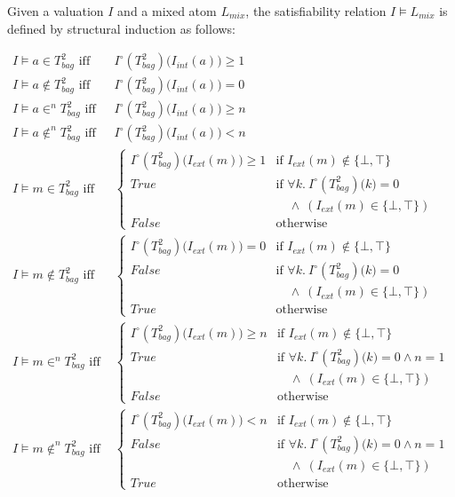 Given a valuation $I$ and a mixed atom $L_{mix}$, the satisfiability relation $I \models L_{mix}$ is defined by structural induction as follows:
\begin{small}
\begin{align*}
I \models a\in T^2_{bag} \mbox{ iff }& I^\circ(T^2_{bag})\big(I_{int}(a)\big) \ge 1 \\
I \models a\notin T^2_{bag} \mbox{ iff }& I^\circ(T^2_{bag})\big(I_{int}(a)\big) = 0 \\
I \models a\in^{n} T^2_{bag} \mbox{ iff }& I^\circ(T^2_{bag})\big(I_{int}(a)\big) \ge n \\
I \models a\notin^{n} T^2_{bag} \mbox{ iff }& I^\circ(T^2_{bag})\big(I_{int}(a)\big) < n \\
I \models m\in T^2_{bag} \mbox{ iff }& \left\{\begin{array}{ll}
I^\circ(T^2_{bag})\big(I_{ext}(m)\big) \ge 1 & \mbox{if } I_{ext}(m)\not\in\{\bot ,\top\} \\
True & \mbox{if } \forall k.~I^\circ(T^2_{bag})\big(k) = 0 \\
     &\quad \land\ (I_{ext}(m) \in \{\bot,\top\})\\
False & \mbox{otherwise}
\end{array}\right.\\
I \models m\notin T^2_{bag} \mbox{ iff }& \left\{\begin{array}{ll}
I^\circ(T^2_{bag})\big(I_{ext}(m)\big) = 0 & \mbox{if } I_{ext}(m)\not\in\{\bot ,\top\} \\
False & \mbox{if } \forall k.~I^\circ(T^2_{bag})\big(k) = 0 \\
     &\quad \land\ (I_{ext}(m) \in \{\bot,\top\})\\
True & \mbox{otherwise}
\end{array}\right.\\
I \models m\in^{n} T^2_{bag} \mbox{ iff }& \left\{\begin{array}{ll}
I^\circ(T^2_{bag})\big(I_{ext}(m)\big) \ge n & \mbox{if } I_{ext}(m)\not\in\{\bot ,\top\} \\
True & \mbox{if } \forall k.~I^\circ(T^2_{bag})\big(k) = 0  \land n = 1\\
     &\quad \land\ (I_{ext}(m) \in \{\bot,\top\})\\
False & \mbox{otherwise}
\end{array}\right.\\
I \models m\notin^{n} T^2_{bag} \mbox{ iff }& \left\{\begin{array}{ll}
I^\circ(T^2_{bag})\big(I_{ext}(m)\big) < n & \mbox{if } I_{ext}(m)\not\in\{\bot ,\top\} \\
False & \mbox{if } \forall k.~I^\circ(T^2_{bag})\big(k) = 0 \land n = 1\\
     &\quad \land\ (I_{ext}(m) \in \{\bot,\top\})\\
True & \mbox{otherwise}
\end{array}\right.
\end{align*}
\end{small}

